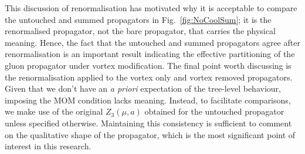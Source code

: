 This discussion of renormalisation has motivated why it is acceptable to compare the untouched and summed propagators in Fig.~\ref{fig:NoCoolSum}; it is the renormalised propagator, not the bare propagator, that carries the physical meaning. Hence, the fact that the untouched and summed propagators agree after renormalisation is an important result indicating the effective partitioning of the gluon propagator under vortex modification. The final point worth discussing is the renormalisation applied to the vortex only and vortex removed propagators. Given that we don't have an {\it a priori} expectation of the tree-level behaviour, imposing the MOM condition lacks meaning. Instead, to facilitate comparisons, we make use of the original $Z_3(\mu, a)$ obtained for the untouched propagator unless specified otherwise. Maintaining this consistency is sufficient to comment on the qualitative shape of the propagator, which is the most significant point of interest in this research. 


